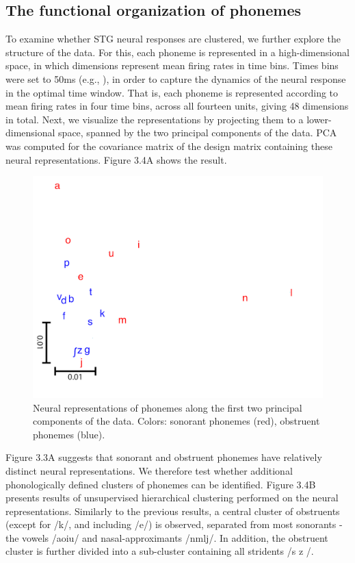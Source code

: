 \subsection{The functional organization of phonemes}
To examine whether STG neural responses are clustered, we further explore the structure of the data. For this, each phoneme is represented in a high-dimensional space, in which dimensions represent mean firing rates in time bins. Times bins were set to 50ms (e.g., \citealp{chan2013speech, Mesgarani2014}), in order to capture the dynamics of the neural response in the optimal time window. That is, each phoneme is represented according to mean firing rates in four time bins, across all fourteen units, giving 48 dimensions in total. Next, we visualize the representations by projecting them to a lower-dimensional space, spanned by the two principal components of the data. PCA was computed for the covariance matrix of the design matrix containing these neural representations. Figure 3.4A shows the result.

\begin{figure}[h]
\vspace{.3in}
\includegraphics[width=\linewidth]{Figures/Ch3/figure4_A.png}
\caption{Neural representations of phonemes along the first two principal components of the data. Colors: sonorant phonemes (red), obstruent phonemes (blue).}
\end{figure}

Figure 3.3A suggests that sonorant and obstruent phonemes have relatively distinct neural representations. We therefore test whether additional phonologically defined clusters of phonemes can be identified. Figure 3.4B presents results of unsupervised hierarchical clustering performed on the neural representations. Similarly to the previous results, a central cluster of obstruents (except for /k/, and including /e/) is observed, separated from most sonorants - the vowels /aoiu/ and nasal-approximants /nmlj/. In addition, the obstruent cluster is further divided into a sub-cluster containing all stridents /s  z /. 

